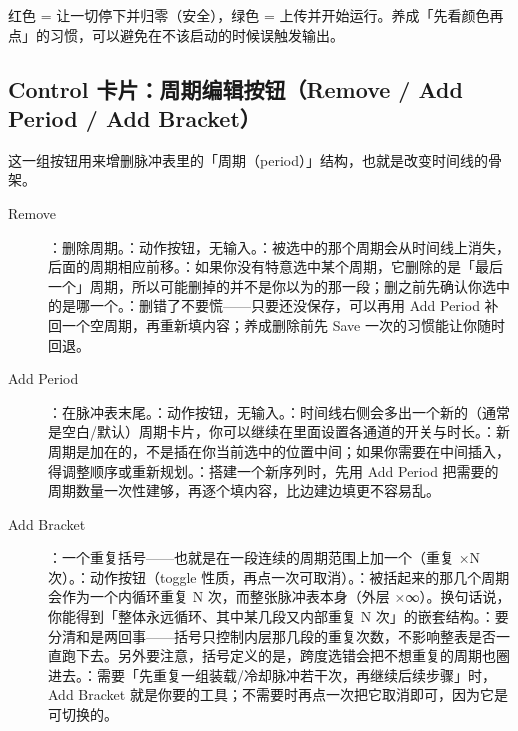\documentclass[11pt,oneside,openany]{book}
\begin{document}
\begin{notebox}[红绿配色的含义]
红色 = 让一切停下并归零（安全），绿色 = 上传并开始运行。养成「先看颜色再点」的习惯，可以避免在不该启动的时候误触发输出。
\end{notebox}

\subsection{Control 卡片：周期编辑按钮（Remove / Add Period / Add Bracket）}

这一组按钮用来增删脉冲表里的「周期（period）」结构，也就是改变时间线的骨架。

\begin{description}
\item[Remove] ：删除周期。：动作按钮，无输入。：被选中的那个周期会从时间线上消失，后面的周期相应前移。：如果你没有特意选中某个周期，它删除的是「最后一个」周期，所以可能删掉的并不是你以为的那一段；删之前先确认你选中的是哪一个。：删错了不要慌——只要还没保存，可以再用 Add Period 补回一个空周期，再重新填内容；养成删除前先 Save 一次的习惯能让你随时回退。

\item[Add Period] ：在脉冲表末尾。：动作按钮，无输入。：时间线右侧会多出一个新的（通常是空白/默认）周期卡片，你可以继续在里面设置各通道的开关与时长。：新周期是加在的，不是插在你当前选中的位置中间；如果你需要在中间插入，得调整顺序或重新规划。：搭建一个新序列时，先用 Add Period 把需要的周期数量一次性建够，再逐个填内容，比边建边填更不容易乱。

\item[Add Bracket] ：一个重复括号——也就是在一段连续的周期范围上加一个（重复 ×N 次）。：动作按钮（toggle 性质，再点一次可取消）。：被括起来的那几个周期会作为一个内循环重复 N 次，而整张脉冲表本身（外层 ×∞）。换句话说，你能得到「整体永远循环、其中某几段又内部重复 N 次」的嵌套结构。：要分清和是两回事——括号只控制内层那几段的重复次数，不影响整表是否一直跑下去。另外要注意，括号定义的是，跨度选错会把不想重复的周期也圈进去。：需要「先重复一组装载/冷却脉冲若干次，再继续后续步骤」时，Add Bracket 就是你要的工具；不需要时再点一次把它取消即可，因为它是可切换的。
\end{description}
\end{document}
